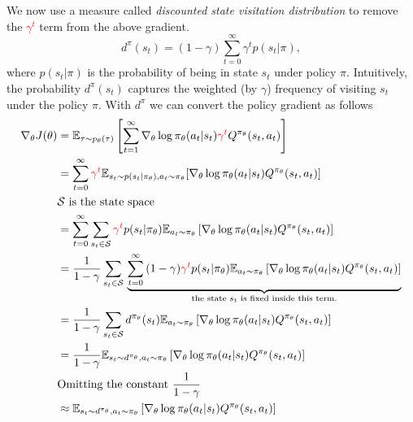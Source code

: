 We now use a measure called \textit{discounted state visitation distribution} to remove the \textcolor{red}{$\gamma^t$} term from the above gradient. 
\[
    d^\pi(s_t) = (1 - \gamma) \sum_{t=0}^{\infty}{\gamma^t p(s_t | \pi)},
\]
where $p(s_t | \pi)$ is the probability of being in state $s_t$ under policy $\pi$. 
Intuitively, the probability $d^\pi(s_t)$ captures the weighted (by $\gamma$) frequency of visiting $s_t$ under the policy $\pi$.
With $d^\pi$ we can convert the policy gradient as follows
\begin{equation}
    \begin{aligned}
         \nabla_\theta J(\theta) &  = \mathbb{E}_{\tau \sim p_\theta(\tau)}\left[ \sum_{t=1}^{\infty} \nabla_\theta \log \pi_{\theta}(a_t | s_t)   \textcolor{red}{\gamma^t} Q^{\pi_\theta}(s_t, a_t)  \right] \\
         & = \sum_{t=0}^{\infty}{ \textcolor{red}{\gamma^t} \mathbb{E}_{s_t \sim p(s_t | \pi_\theta), a_t \sim \pi_\theta}{\left[ \nabla_\theta \log \pi_{\theta}(a_t | s_t) Q^{\pi_\theta}(s_t, a_t)\right]}} \\
         & \text{$\mathcal{S}$ is the state space} \\
         & = \sum_{t=0}^{\infty}{\sum_{s_t \in \mathcal{S}}^{}{    \textcolor{red}{\gamma^t} p(s_t | \pi_\theta)  \mathbb{E}_{a_t \sim \pi_\theta}\left[  \nabla_\theta \log \pi_{\theta}(a_t | s_t) Q^{\pi_\theta}(s_t, a_t) \right]       }} \\
         & = \frac{1}{1 - \gamma} \sum_{s_t \in \mathcal{S}}^{}{} \underbrace{  \sum_{t=0}^{\infty}{    (1 - \gamma) \textcolor{red}{\gamma^t} p(s_t | \pi_\theta)  \mathbb{E}_{a_t \sim \pi_\theta}\left[  \nabla_\theta \log \pi_{\theta}(a_t | s_t) Q^{\pi_\theta}(s_t, a_t) \right]}      }_{\text{the state $s_t$ is fixed inside this term.}} \\
         & = \frac{1}{1 - \gamma} \sum_{s_t \in \mathcal{S}}^{}{ d^{\pi_\theta}(s_t)  \mathbb{E}_{a_t \sim \pi_\theta}\left[  \nabla_\theta \log \pi_{\theta}(a_t | s_t) Q^{\pi_\theta}(s_t, a_t) \right]} \\
         & = \frac{1}{1 - \gamma} \mathbb{E}_{s_t \sim d^{\pi_\theta}, a_t \sim \pi_{\theta}}\left[  \nabla_\theta \log \pi_{\theta}(a_t | s_t) Q^{\pi_\theta}(s_t, a_t) \right] \\
         & \text{Omitting the constant $\frac{1}{1 - \gamma}$} \\
         & \approx \mathbb{E}_{s_t \sim d^{\pi_\theta}, a_t \sim \pi_{\theta}}\left[  \nabla_\theta \log \pi_{\theta}(a_t | s_t) Q^{\pi_\theta}(s_t, a_t) \right]
    \end{aligned}
\end{equation}



